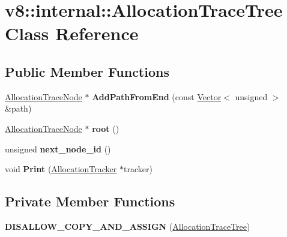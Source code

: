 \hypertarget{classv8_1_1internal_1_1_allocation_trace_tree}{}\section{v8\+:\+:internal\+:\+:Allocation\+Trace\+Tree Class Reference}
\label{classv8_1_1internal_1_1_allocation_trace_tree}
\subsection*{Public Member Functions}
\begin{DoxyCompactItemize}
\item 
\hyperlink{classv8_1_1internal_1_1_allocation_trace_node}{Allocation\+Trace\+Node} $\ast$ {\bfseries Add\+Path\+From\+End} (const \hyperlink{classv8_1_1internal_1_1_vector}{Vector}$<$ unsigned $>$ \&path)\hypertarget{classv8_1_1internal_1_1_allocation_trace_tree_ac5d8e76d5c1250e5a0c0453d79fc656e}{}\label{classv8_1_1internal_1_1_allocation_trace_tree_ac5d8e76d5c1250e5a0c0453d79fc656e}

\item 
\hyperlink{classv8_1_1internal_1_1_allocation_trace_node}{Allocation\+Trace\+Node} $\ast$ {\bfseries root} ()\hypertarget{classv8_1_1internal_1_1_allocation_trace_tree_af36cd4ae9797ba6e8681349f3db7d0b0}{}\label{classv8_1_1internal_1_1_allocation_trace_tree_af36cd4ae9797ba6e8681349f3db7d0b0}

\item 
unsigned {\bfseries next\+\_\+node\+\_\+id} ()\hypertarget{classv8_1_1internal_1_1_allocation_trace_tree_aed92bbd12c4ca3ea8dfabf9f3ce16d9e}{}\label{classv8_1_1internal_1_1_allocation_trace_tree_aed92bbd12c4ca3ea8dfabf9f3ce16d9e}

\item 
void {\bfseries Print} (\hyperlink{classv8_1_1internal_1_1_allocation_tracker}{Allocation\+Tracker} $\ast$tracker)\hypertarget{classv8_1_1internal_1_1_allocation_trace_tree_a37ac3b1e978232c6150a1d3edf4da9ce}{}\label{classv8_1_1internal_1_1_allocation_trace_tree_a37ac3b1e978232c6150a1d3edf4da9ce}

\end{DoxyCompactItemize}
\subsection*{Private Member Functions}
\begin{DoxyCompactItemize}
\item 
{\bfseries D\+I\+S\+A\+L\+L\+O\+W\+\_\+\+C\+O\+P\+Y\+\_\+\+A\+N\+D\+\_\+\+A\+S\+S\+I\+GN} (\hyperlink{classv8_1_1internal_1_1_allocation_trace_tree}{Allocation\+Trace\+Tree})\hypertarget{classv8_1_1internal_1_1_allocation_trace_tree_abf63511271337fe2fe331a321e053fba}{}\label{classv8_1_1internal_1_1_allocation_trace_tree_abf63511271337fe2fe331a321e053fba}

\end{DoxyCompactItemize}
